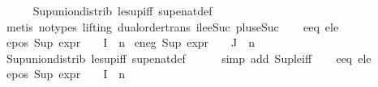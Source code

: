 \begin{isabellebody}
\ \ \ \ \isamarkupfalse%
\ Sup{\isacharunderscore}{\kern0pt}union{\isacharunderscore}{\kern0pt}distrib\ le{\isacharunderscore}{\kern0pt}sup{\isacharunderscore}{\kern0pt}iff\ sup{\isacharunderscore}{\kern0pt}enat{\isacharunderscore}{\kern0pt}def\isanewline
\ \ \ \ \isamarkupfalse%
\ {\isacharparenleft}{\kern0pt}metis\ {\isacharparenleft}{\kern0pt}no{\isacharunderscore}{\kern0pt}types{\isacharcomma}{\kern0pt}\ lifting{\isacharparenright}{\kern0pt}\ dual{\isacharunderscore}{\kern0pt}order{\isachardot}{\kern0pt}trans\ ile{\isacharunderscore}{\kern0pt}eSuc\ plus{\isacharunderscore}{\kern0pt}{}{\isacharunderscore}{\kern0pt}eSuc{\isacharparenleft}{\kern0pt}{}{\isacharparenright}{\kern0pt}{\isacharparenright}{\kern0pt}{\isacharplus}{\kern0pt}\isanewline
\isanewline
\ \ \isamarkupfalse%
\ e{}{\isacharunderscore}{\kern0pt}eq\ e{}{\isacharunderscore}{\kern0pt}le\ \isamarkupfalse%
\ e{}{\isacharunderscore}{\kern0pt}pos{\isacharcolon}{\kern0pt}\ {\isachardoublequoteopen}Sup\ {\isacharparenleft}{\kern0pt}{\isacharparenleft}{\kern0pt}expr{\isacharunderscore}{\kern0pt}{}\ {\isasymcirc}\ {\isasymPhi}{\isacharparenright}{\kern0pt}\ {\isacharbackquote}{\kern0pt}\ I{\isacharparenright}{\kern0pt}\ {\isacharless}{\kern0pt}{\isacharequal}{\kern0pt}\ n{}{\isachardoublequoteclose}\isanewline
{}\ e{}{\isacharunderscore}{\kern0pt}neg{\isacharcolon}{\kern0pt}\ {\isachardoublequoteopen}Sup\ {\isacharparenleft}{\kern0pt}{\isacharparenleft}{\kern0pt}expr{\isacharunderscore}{\kern0pt}{}\ {\isasymcirc}\ {\isasymPhi}{\isacharparenright}{\kern0pt}\ {\isacharbackquote}{\kern0pt}\ J{\isacharparenright}{\kern0pt}\ {\isacharless}{\kern0pt}{\isacharequal}{\kern0pt}\ n{}{\isachardoublequoteclose}\isanewline
\ \ \ \ \isamarkupfalse%
\ Sup{\isacharunderscore}{\kern0pt}union{\isacharunderscore}{\kern0pt}distrib\ le{\isacharunderscore}{\kern0pt}sup{\isacharunderscore}{\kern0pt}iff\ sup{\isacharunderscore}{\kern0pt}enat{\isacharunderscore}{\kern0pt}def\isanewline
\ \ \ \ \isamarkupfalse%
\ {\isacharparenleft}{\kern0pt}simp\ add{\isacharcolon}{\kern0pt}\ Sup{\isacharunderscore}{\kern0pt}le{\isacharunderscore}{\kern0pt}iff{\isacharparenright}{\kern0pt}{\isacharplus}{\kern0pt}\isanewline
\isanewline
\ \ \isamarkupfalse%
\ e{}{\isacharunderscore}{\kern0pt}eq\ e{}{\isacharunderscore}{\kern0pt}le\ \isamarkupfalse%
\ e{}{\isacharunderscore}{\kern0pt}pos{\isacharcolon}{\kern0pt}\ {\isachardoublequoteopen}Sup\ {\isacharparenleft}{\kern0pt}{\isacharparenleft}{\kern0pt}expr{\isacharunderscore}{\kern0pt}{}\ {\isasymcirc}\ {\isasymPhi}{\isacharparenright}{\kern0pt}\ {\isacharbackquote}{\kern0pt}\ I{\isacharparenright}{\kern0pt}\ {\isasymle}\ n{}{\isachardoublequoteclose}\isanewline

\end{isabellebody}
